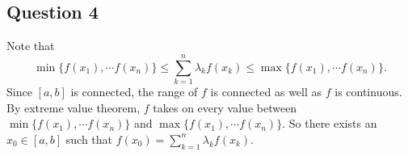 \documentclass{article}
\begin{document}


\subsection*{Question 4}
Note that 
\begin{equation*}
    \min\{f(x_1), \cdots f(x_n)\} \leq \sum_{k=1}^n \lambda_k f(x_k) \leq \max\{f(x_1), \cdots f(x_n)\}.
\end{equation*}
Since $[a,b]$ is connected, the range of $f$ is connected as well as $f$ is continuous. By extreme value theorem, $f$ takes on every value between $\min\{f(x_1), \cdots f(x_n)\} $ and $\max\{f(x_1), \cdots f(x_n)\}$. So there exists an $x_0 \in [a,b]$ such that $f(x_0) = \sum_{k=1}^n \lambda_k f(x_k)$.
\end{document}
